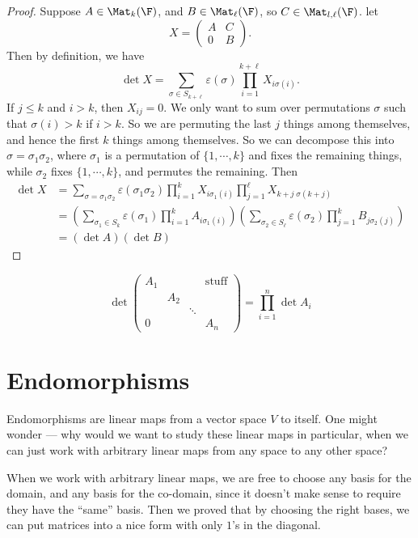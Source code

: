 \documentclass[a4paper]{article}
\begin{document}
\begin{proof}
  Suppose $A\in \Mat_k(\F)$, and $B\in \Mat_{\ell}(\F)$, so $C \in \Mat_{l, \ell}(\F)$. let
  \[
    X =
    \begin{pmatrix}
      A & C\\
      0 & B
    \end{pmatrix}.
  \]
  Then by definition, we have
  \[
    \det X = \sum_{\sigma \in S_{k + \ell}}\varepsilon(\sigma) \prod_{i = 1}^{k + \ell} X_{i\sigma(i)}.
  \]
  If $j \leq k$ and $i > k$, then $X_{ij} = 0$. We only want to sum over permutations $\sigma$ such that $\sigma(i) > k$ if $i > k$. So we are permuting the last $j$ things among themselves, and hence the first $k$ things among themselves. So we can decompose this into $\sigma = \sigma_1 \sigma_2$, where $\sigma_1$ is a permutation of $\{1, \cdots, k\}$ and fixes the remaining things, while $\sigma_2$ fixes $\{1, \cdots, k\}$, and permutes the remaining. Then
  \begin{align*}
    \det X &= \sum_{\sigma = \sigma_1\sigma_2}\varepsilon(\sigma_1\sigma_2) \prod_{i = 1}^k X_{i\sigma_1(i)} \prod_{j = 1}^\ell X_{k + j\; \sigma(k + j)}\\
    &= \left(\sum_{\sigma_1 \in S_k} \varepsilon(\sigma_1) \prod_{i = 1}^k A_{i\sigma_1(i)}\right)\left(\sum_{\sigma_2 \in S_\ell} \varepsilon(\sigma_2) \prod_{j = 1}^k B_{j\sigma_2(j)}\right)\\
    &= (\det A)(\det B)
  \end{align*}
\end{proof}

\begin{cor}
  \[
    \det
    \begin{pmatrix}
      A_1 & & & \mathrm{stuff}\\
      & A_2\\
      & & \ddots\\
      0 & & & A_n
    \end{pmatrix} = \prod_{i = 1}^n \det A_i
  \]
\end{cor}

\section{Endomorphisms}
Endomorphisms are linear maps from a vector space $V$ to itself. One might wonder --- why would we want to study these linear maps in particular, when we can just work with arbitrary linear maps from any space to any other space?

When we work with arbitrary linear maps, we are free to choose any basis for the domain, and any basis for the co-domain, since it doesn't make sense to require they have the ``same'' basis. Then we proved that by choosing the right bases, we can put matrices into a nice form with only $1$'s in the diagonal.
\end{document}
